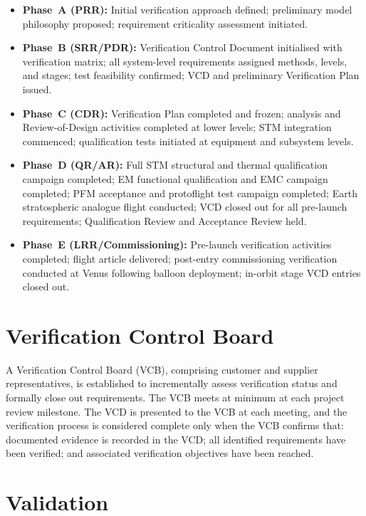 \begin{itemize}[itemsep=1pt, parsep=1pt]
    \item \textbf{Phase~A (PRR):} Initial verification approach defined; preliminary model philosophy proposed; requirement criticality assessment initiated.
    \item \textbf{Phase~B (SRR/PDR):} Verification Control Document initialised with verification matrix; all system-level requirements assigned methods, levels, and stages; test feasibility confirmed; VCD and preliminary Verification Plan issued.
    \item \textbf{Phase~C (CDR):} Verification Plan completed and frozen; analysis and Review-of-Design activities completed at lower levels; STM integration commenced; qualification tests initiated at equipment and subsystem levels.
    \item \textbf{Phase~D (QR/AR):} Full STM structural and thermal qualification campaign completed; EM functional qualification and EMC campaign completed; PFM acceptance and protoflight test campaign completed; Earth stratospheric analogue flight conducted; VCD closed out for all pre-launch requirements; Qualification Review and Acceptance Review held.
    \item \textbf{Phase~E (LRR/Commissioning):} Pre-launch verification activities completed; flight article delivered; post-entry commissioning verification conducted at Venus following balloon deployment; in-orbit stage VCD entries closed out.
\end{itemize}

\section{Verification Control Board}

A Verification Control Board (VCB), comprising customer and supplier representatives, is established to incrementally assess verification status and formally close out requirements. The VCB meets at minimum at each project review milestone. The VCD is presented to the VCB at each meeting, and the verification process is considered complete only when the VCB confirms that: documented evidence is recorded in the VCD; all identified requirements have been verified; and associated verification objectives have been reached.


\section{Validation}
